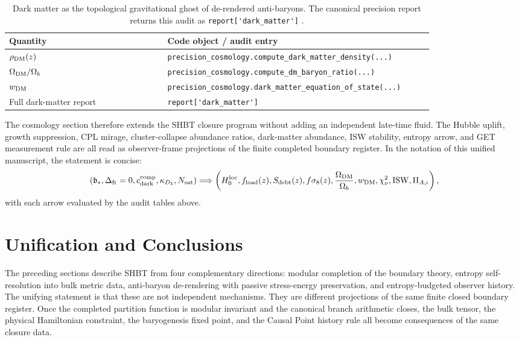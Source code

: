 \documentclass[11pt]{article}
\DeclareRobustCommand{\pyvar}[1]{%
  \ifmmode\text{\nolinkurl{#1}}\else\nolinkurl{#1}\fi%
}
\newcommand{\branchstar}{\mathfrak b_*}
\newcommand{\Deltafr}{\Delta_{\rm fr}}
\newcommand{\cdarkcomp}{c_{\rm dark}^{\rm comp}}
\newcommand{\Nsat}{N_{\rm sat}}
\newcommand{\hloc}{H_0^{\rm loc}}
\newcommand{\fload}{f_{\rm load}}
\newcommand{\kappad}{\kappa_{D_5}}
\begin{document}
\begin{table}[H]
\centering
\small
\begin{tabular}{@{}p{0.34\linewidth}p{0.58\linewidth}@{}}
\toprule
Quantity & Code object / audit entry \\
\midrule
\(\rho_{\rm DM}(z)\) & \pyvar{precision_cosmology.compute_dark_matter_density(...)} \\
\(\Omega_{\rm DM}/\Omega_b\) & \pyvar{precision_cosmology.compute_dm_baryon_ratio(...)} \\
\(w_{\rm DM}\) & \pyvar{precision_cosmology.dark_matter_equation_of_state(...)} \\
Full dark-matter report & \pyvar{report['dark_matter']} \\
\bottomrule
\end{tabular}
\caption{Dark matter as the topological gravitational ghost of de-rendered
anti-baryons.  The canonical precision report returns this audit as
\pyvar{report['dark_matter']}.}
\label{tab:dark-matter-audit}
\end{table}

The cosmology section therefore extends the SHBT closure program without
adding an independent late-time fluid.  The Hubble uplift, growth suppression,
CPL mirage, cluster-collapse abundance ratios, dark-matter abundance, ISW
stability, entropy arrow, and GET measurement rule are all
read as
observer-frame projections of the finite completed boundary register.  In the
notation of this unified manuscript, the statement is concise:
\begin{equation}
\label{eq:precision-cosmology-closure-summary}
 \left(
 \branchstar,\Deltafr=0,\cdarkcomp,\kappad,\Nsat
 \right)
 \Longrightarrow
 \left(
 \hloc,\fload(z),S_{\rm debt}(z),
 f\sigma_8(z),\frac{\Omega_{\rm DM}}{\Omega_b},w_{\rm DM},
 \chi^2_{\nu},{\rm ISW},
 \Pi_{A,\iota}
 \right),
\end{equation}
with each arrow evaluated by the audit tables above.

\section{Unification and Conclusions}
\label{sec:unification-and-conclusions}

The preceding sections describe SHBT from four complementary directions:
modular completion of the boundary theory, entropy self-resolution into bulk
metric data, anti-baryon de-rendering with passive stress-energy preservation,
and entropy-budgeted observer history.  The unifying statement is that these
are not independent mechanisms.  They are different projections of the same
finite closed boundary register.  Once the completed partition function is
modular invariant and the canonical branch arithmetic closes, the bulk tensor,
the physical Hamiltonian constraint, the baryogenesis fixed point, and the
Causal Point history rule all become consequences of the same closure data.
\end{document}
